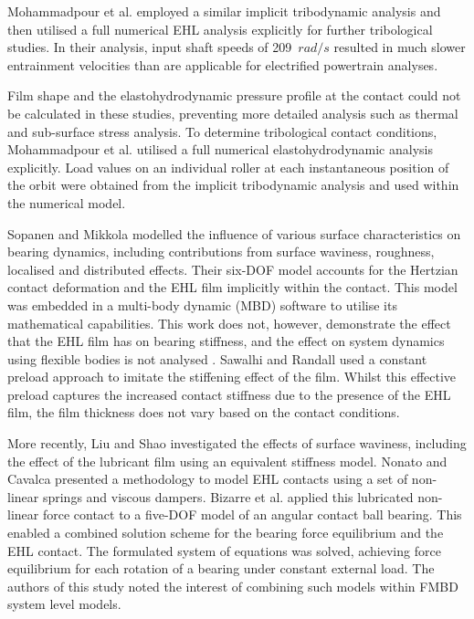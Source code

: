 Mohammadpour et al. \cite{Mohammadpour2015c} employed a similar implicit tribodynamic analysis and then utilised a full numerical EHL analysis explicitly for further tribological studies. In their analysis, input shaft speeds of 209~$rad/s$ resulted in much slower entrainment velocities than are applicable for electrified powertrain analyses. 

Film shape and the elastohydrodynamic pressure profile at the contact could not be calculated in these studies, preventing more detailed analysis such as thermal and sub-surface stress analysis. To determine tribological contact conditions, Mohammadpour et al. \cite{Mohammadpour2015c} utilised a full numerical elastohydrodynamic analysis explicitly. Load values on an individual roller at each instantaneous position of the orbit were obtained from the implicit tribodynamic analysis and used within the numerical model.

Sopanen and Mikkola \cite{Sopanen2003_1} modelled the influence of various surface characteristics on bearing dynamics, including contributions from surface waviness, roughness, localised and distributed effects. Their six-DOF model accounts for the Hertzian contact deformation and the EHL film implicitly within the contact. This model was embedded in a multi-body dynamic (MBD) software to utilise its mathematical capabilities. This work does not, however, demonstrate the effect that the EHL film has on bearing stiffness, and the effect on system dynamics using flexible bodies is not analysed \cite{Sopanen2003_2}. Sawalhi and Randall \cite{Sawalhi2008} used a constant preload approach to imitate the stiffening effect of the film. Whilst this effective preload captures the increased contact stiffness due to the presence of the EHL film, the film thickness does not vary based on the contact conditions.

More recently, Liu and Shao \cite{Liu2017b} investigated the effects of surface waviness, including the effect of the lubricant film using an equivalent stiffness model. Nonato and Cavalca \cite{Nonato2014} presented a methodology to model EHL contacts using a set of non-linear springs and viscous dampers. Bizarre et al. \cite{Bizarre2018} applied this lubricated non-linear force contact to a five-DOF model of an angular contact ball bearing. This enabled a combined solution scheme for the bearing force equilibrium and the EHL contact. The formulated system of equations was solved, achieving force equilibrium for each rotation of a bearing under constant external load. The authors of this study noted the interest of combining such models within FMBD system level models.

